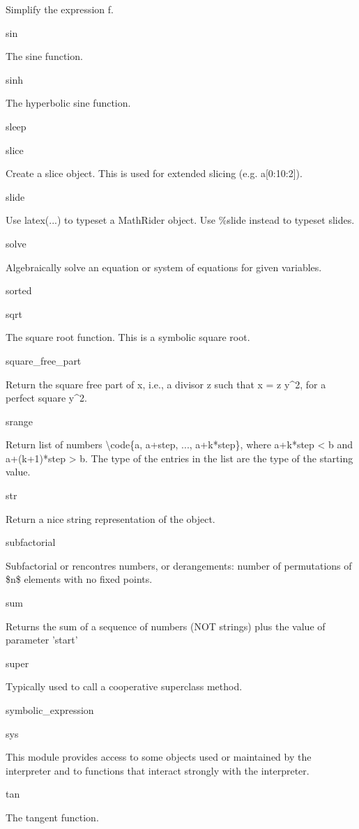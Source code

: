 \documentclass[12pt,oneside]{book}
\begin{document}
Simplify the expression f.

sin

The sine function.

sinh

The hyperbolic sine function.

sleep


slice

Create a slice object. This is used for extended slicing (e.g. a[0:10:2]).

slide

Use latex(...) to typeset a MathRider object. Use \%slide instead to typeset slides.

solve

Algebraically solve an equation or system of equations for given variables.

sorted


sqrt

The square root function. This is a symbolic square root.

square\_free\_part

Return the square free part of x, i.e., a divisor z such that x = z y\^{}2, for a perfect square y\^{}2.

srange

Return list of numbers {\textbackslash}code\{a, a+step, ..., a+k*step\}, where a+k*step {\textless} b and a+(k+1)*step {\textgreater} b. The type of the entries in the list are the type of the starting value.

str

Return a nice string representation of the object.

subfactorial

Subfactorial or rencontres numbers, or derangements: number of permutations of \$n\$ elements with no fixed points.

sum

Returns the sum of a sequence of numbers (NOT strings) plus the value of parameter 'start'

super

Typically used to call a cooperative superclass method.

symbolic\_expression 


sys

This module provides access to some objects used or maintained by the interpreter and to functions that interact strongly with the interpreter.

tan

The tangent function.
\end{document}
